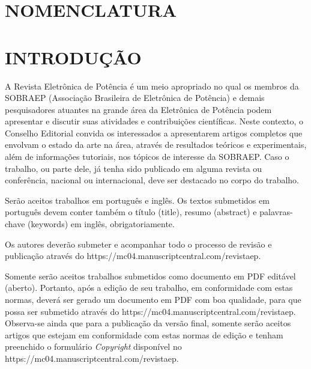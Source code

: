 \documentclass[portugues]{sobraep}
\begin{document}
\let\thefootnote\relax{}

\section*{NOMENCLATURA}



\section{INTRODUÇÃO}

A Revista Eletrônica de Potência é um meio apropriado no qual os membros da SOBRAEP (Associação Brasileira de Eletrônica de Potência) e demais pesquisadores atuantes na grande área da Eletrônica de Potência podem apresentar e discutir suas atividades e contribuições científicas. Neste contexto, o Conselho Editorial convida os interessados a apresentarem artigos completos que envolvam o estado da arte na área, através de resultados teóricos e experimentais, além de informações tutoriais, nos tópicos de interesse da SOBRAEP. Caso o trabalho, ou parte dele, já tenha sido publicado em alguma revista ou conferência, nacional ou internacional, deve ser destacado no corpo do trabalho.

Serão aceitos trabalhos em português e inglês. Os textos submetidos em português devem conter também o título (title), resumo (abstract) e palavras-chave (keywords) em inglês, obrigatoriamente.

Os autores deverão submeter e acompanhar todo o processo de revisão e publicação através do https://mc04.manuscriptcentral.com/revistaep.

Somente serão aceitos trabalhos submetidos como documento em PDF editável (aberto). Portanto, após a edição de seu trabalho, em conformidade com estas normas, deverá ser gerado um documento em PDF com boa qualidade, para que possa ser submetido através do https://mc04.manuscriptcentral.com/revistaep. Observa-se ainda que para a publicação da versão final, somente serão aceitos artigos que estejam em conformidade com estas normas de edição e tenham preenchido o formulário \textit{Copyright} disponível no https://mc04.manuscriptcentral.com/revistaep.
\end{document}
